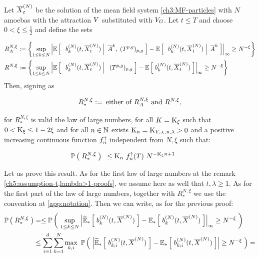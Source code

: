 \begin{proposition}\label{ch5:prop:LLN2}
	
	Let $\overline{X}_t^{(N)}$ be the solution of the mean field system \ref{ch3:MF-particles} with $N$ amoebas with the attraction $V$ substituted with $V_{G}$.	
	Let $t \leq T$ and choose $0  < \xi \leq \frac{1}{2}$ and define the sets
	
	\begin{equation*}
		\begin{aligned}
			R^{N,\xi}_A
			&:= \left\{ \sup_{1\leq k \leq N} 
			{ \left| 
				\mathbb{E} \left[ \; \left. \; 
					b^{(N)}_k(t,\overline{X}_t^{(N)})
				 \; \right| \; \overline{A}^k,\;(T^{p,g})_{p,g} \; \right]
				-
				\mathbb{E} \left[ \; \left. \; b^{(N)}_k(t,\overline{X}_t^{(N)}) \; \right| \; \overline{A}^k \; \right]
			 \right|_{\infty} } 
			\geq N^{-\xi} 
			\right\}
			\\
			R^{N, \xi}
			&:= \left\{ \sup_{1\leq k \leq N} 
			{ \left| 
				\mathbb{E} \left[ \; \left. \; 
					b^{(N)}_k(t,\overline{X}_t^{(N)})
				 \; \right| \; \;(T^{p,g})_{p,g} \; \right]
				-
				\mathbb{E} \left[ \; b^{(N)}_k(t,\overline{X}_t^{(N)}) \; \right]
			 \right|_{\infty} } 
			\geq N^{-\xi} 
			\right\}
		\end{aligned}
	\end{equation*}
	Then, signing as
	
	\begin{equation*}
		R^{N, \xi}_\ast := \: \text{either of $R^{N, \xi}_A$ and $R^{N, \xi}$}, 
	\end{equation*}
	
	for $R^{N,\xi}_\ast$ is valid the law of large numbers, \ie for all $K=\text{K}_\xi$ such that $0< \text{K}_\xi \leq 1 - 2\xi$ and for all $n\in\mathbb{N}$ exists $\text{K}_n = \text{K}_{V,\curlywedge,n,\lambda} > 0$ and a positive increasing continuous function $f^\uparrow_n$ independent from $N,\xi$ such that:
	
	\begin{align}
		& \mathbb{P} \left( \; R^{N,\xi}_\ast \; \right){}\
		\leq
			\text{K}_n\
			f^\uparrow_n(T)\
			N^{-\text{K}_\xi n + 1}
		&& \label{ch5:LLN2:cond}
	\end{align}
\end{proposition}

Let us prove this result.
As for the first law of large numbers at the remark \ref{ch5:assumption-t,lambda>1-proofs}, we assume here as well that $t,\lambda\geq1$.
As for the first part of the law of large numbers, together with $R^{N,\xi}_\ast$ we use the convention at \ref{app:notation}.
Then we can write, as for the previous proof:
	\begin{align*}
		\mathbb{P} \left( \; R^{N, \xi}_\ast \; \right)
		&= \leq
		\mathbb{P} \left( \; 
			\sup_{1\leq k \leq N} 
			{ \left| 
				\widetilde{\mathbb{E}}_{\ast} \left[ \; b^{(N)}_k(t,\overline{X}^{(N)}) \; \right]
				-
				\mathbb{E}_{\ast} \left[ \; b^{(N)}_k(t,\overline{X}^{(N)}) \; \right]
			 \right|_{\infty} } 
			\geq 
			N^{-\xi} 
		 \; \right)
		\\
		&\leq
		\sum_{i=1}^{d}
		\sum_{k=1}^{N}
		\max_{k,i}\
		\mathbb{P} \left( \; 
			\left| 
				\widetilde{\mathbb{E}}_{\ast} \left[ \; b^{(N)}_{k;i}(t,\overline{X}^{(N)}) \; \right]
				-
				\mathbb{E}_{\ast} \left[ \; b^{(N)}_{k;i}(t,\overline{X}^{(N)}) \; \right]
			 \right|
			\geq 
			N^{-\xi} 
		 \; \right)
		=
	\end{align*}
	
